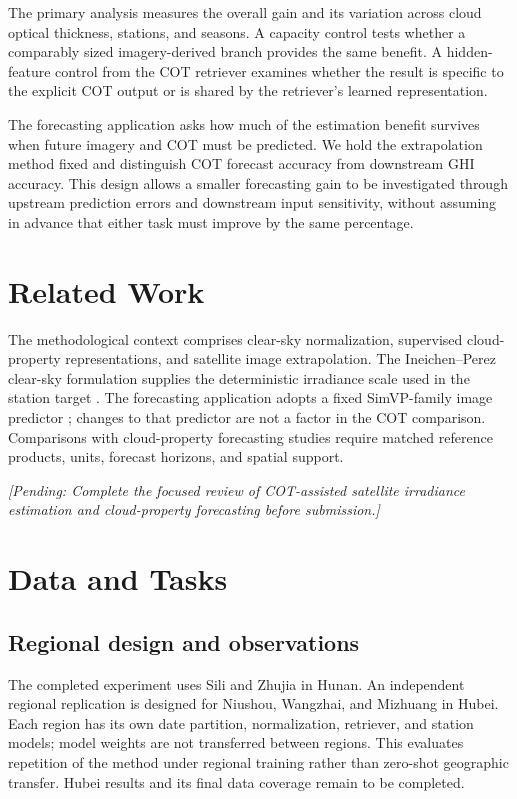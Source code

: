 \documentclass[11pt]{article}
\newcommand{\pending}[1]{\textit{[Pending: #1]}}
\begin{document}
The primary analysis measures the overall gain and its variation across cloud optical thickness, stations, and seasons. A capacity control tests whether a comparably sized imagery-derived branch provides the same benefit. A hidden-feature control from the COT retriever examines whether the result is specific to the explicit COT output or is shared by the retriever's learned representation.

The forecasting application asks how much of the estimation benefit survives when future imagery and COT must be predicted. We hold the extrapolation method fixed and distinguish COT forecast accuracy from downstream GHI accuracy. This design allows a smaller forecasting gain to be investigated through upstream prediction errors and downstream input sensitivity, without assuming in advance that either task must improve by the same percentage.
\section{Related Work}
The methodological context comprises clear-sky normalization, supervised cloud-property representations, and satellite image extrapolation. The Ineichen--Perez clear-sky formulation supplies the deterministic irradiance scale used in the station target \cite{ineichen}. The forecasting application adopts a fixed SimVP-family image predictor \cite{simvp,simvpv2}; changes to that predictor are not a factor in the COT comparison. Comparisons with cloud-property forecasting studies require matched reference products, units, forecast horizons, and spatial support.

\pending{Complete the focused review of COT-assisted satellite irradiance estimation and cloud-property forecasting before submission.}
\section{Data and Tasks}
\subsection{Regional design and observations}
The completed experiment uses Sili and Zhujia in Hunan. An independent regional replication is designed for Niushou, Wangzhai, and Mizhuang in Hubei. Each region has its own date partition, normalization, retriever, and station models; model weights are not transferred between regions. This evaluates repetition of the method under regional training rather than zero-shot geographic transfer. Hubei results and its final data coverage remain to be completed.
\end{document}
